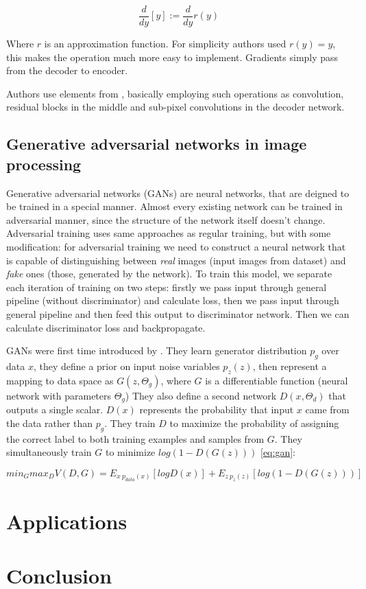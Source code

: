 \begin{equation}
    \label{eq:quantization}
    \frac{d}{dy}[y]:=\frac{d}{dy}r(y)
\end{equation}

Where $r$ is an approximation function. For simplicity authors used $r(y)=y$, this makes the operation much more easy to implement. Gradients simply pass from the decoder to encoder.

Authors use elements from \cite{shi_real-time_2016}, basically employing such operations as convolution, residual blocks in the middle and sub-pixel convolutions in the decoder network.

\section{Generative adversarial networks in image processing}

Generative adversarial networks (GANs) are neural networks, that are deigned to be trained in a special manner. Almost every existing network can be trained in adversarial manner, since the structure of the network itself doesn't change. Adversarial training uses same approaches as regular training, but with some modification: for adversarial training we need to construct a neural network that is capable of distinguishing between \textit{real} images (input images from dataset) and \textit{fake} ones (those, generated by the network). To train this model, we separate each iteration of training on two steps: firstly we pass input through general pipeline (without discriminator) and calculate loss, then we pass input through general pipeline and then feed this output to discriminator network. Then we can calculate discriminator loss and backpropagate.

GANs were first time introduced by \cite[Goodfellow et al]{Goodfellow_Pouget-Abadie_Mirza_Xu_Warde-Farley_Ozair_Courville_Bengio_2014}. They learn generator distribution $p_g$ over data $x$, they define a prior on input noise variables $p_z(z)$, then represent a mapping to data space as $G(z, \Theta_g)$, where $G$ is a differentiable function (neural network with parameters $\Theta_g$) They also define a second network $D(x, \Theta_d)$ that outputs a single scalar. $D(x)$ represents the probability that input $x$ came from the data rather than $p_g$. They train $D$ to maximize the probability of assigning the correct label to both training examples and samples from $G$. They simultaneously train $G$ to minimize $log(1 − D(G(z)))$ \ref{eq:gan}:

\begin{equation}
    \label{eq:gan}
    min_G max_D V(D, G) = E_{x~p_{data}(x)} [log D(x)] + E_{z~p_z(z)} [log(1 - D(G(z)))]
\end{equation}

\chapter{Applications}

\chapter{Conclusion}

